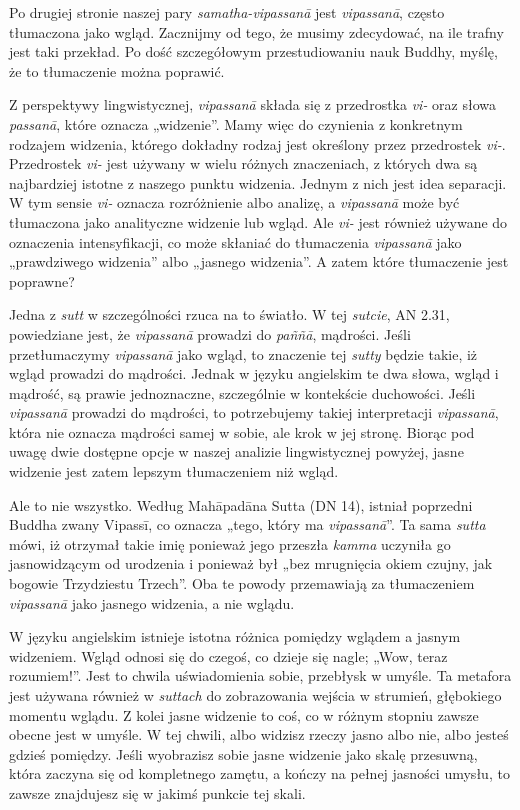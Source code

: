 \documentclass[12pt,openany]{book}
\begin{document}
Po drugiej stronie naszej pary \textit{samatha}\textit{-vipassanā} jest \textit{vipassanā}, \linebreak często tłumaczona jako wgląd. Zacznijmy od tego, że musimy \linebreak zdecydować, na ile trafny jest taki przekład. Po dość szczegółowym przestudiowaniu nauk Buddhy, myślę, że to tłumaczenie można poprawić.

Z perspektywy lingwistycznej, \textit{vipassanā} składa się z przedrostka \textit{vi-} oraz słowa \textit{passanā}, które oznacza „widzenie”. Mamy więc do czynienia z konkretnym rodzajem widzenia, którego dokładny rodzaj jest określony przez przedrostek \textit{vi-}. Przedrostek \textit{vi-} jest używany w wielu różnych znaczeniach, z których dwa są najbardziej istotne z naszego punktu widzenia. Jednym z nich jest idea separacji. W tym sensie \textit{vi-} oznacza rozróżnienie albo analizę, a \textit{vipassanā} może być tłumaczona jako analityczne widzenie lub wgląd. Ale \textit{vi-} jest również używane do oznaczenia intensyfikacji, co może skłaniać do tłumaczenia \textit{vipassanā} jako „prawdziwego widzenia” albo „jasnego widzenia”. A zatem które tłumaczenie jest poprawne?

Jedna z \textit{sutt} w szczególności rzuca na to światło. W tej \textit{sutcie}, AN 2.31, powiedziane jest, że \textit{vipassanā} prowadzi do \textit{paññā}, mądrości. Jeśli przetłumaczymy \textit{vipassanā} jako wgląd, to znaczenie tej \textit{sutty} będzie takie, iż wgląd prowadzi do mądrości. Jednak w języku angielskim te dwa słowa, wgląd i mądrość, są prawie jednoznaczne, szczególnie w kontekście duchowości. Jeśli \textit{vipassanā} prowadzi do mądrości, to potrzebujemy takiej interpretacji \textit{vipassanā}, która nie oznacza mądrości samej w sobie, ale krok w jej stronę. Biorąc pod uwagę dwie dostępne opcje w naszej analizie lingwistycznej powyżej, jasne widzenie jest zatem lepszym tłumaczeniem niż wgląd.

Ale to nie wszystko. Według Mahāpadāna Sutta (DN 14), istniał poprzedni Buddha zwany Vipassī, co oznacza „tego, który ma \textit{vipassanā}”. Ta sama \textit{sutta} mówi, iż otrzymał takie imię ponieważ jego przeszła  \textit{kamma} uczyniła go jasnowidzącym od urodzenia i ponieważ był „bez mrugnięcia okiem czujny, jak bogowie Trzydziestu Trzech”. Oba te powody przemawiają za tłumaczeniem  \textit{vipassanā} jako jasnego widzenia, a nie wglądu.

W języku angielskim istnieje istotna różnica pomiędzy wglądem a jasnym widzeniem. Wgląd odnosi się do czegoś, co dzieje się nagle; „Wow, teraz rozumiem!”. Jest to chwila uświadomienia sobie, przebłysk w umyśle. Ta metafora jest używana również w \textit{suttach} do zobrazowania wejścia w strumień, głębokiego momen\-tu wglądu. Z kolei jasne widzenie to coś, co w różnym stopniu zawsze obecne jest w umyśle. W tej chwili, albo widzisz rzeczy jasno albo nie, albo jesteś gdzieś pomiędzy. Jeśli wyobrazisz sobie jasne widzenie jako skalę przesuwną, która zaczyna się od kompletnego zamętu, a kończy na pełnej jasności umysłu, to zawsze znajdujesz się w jakimś punkcie tej skali.
\end{document}
